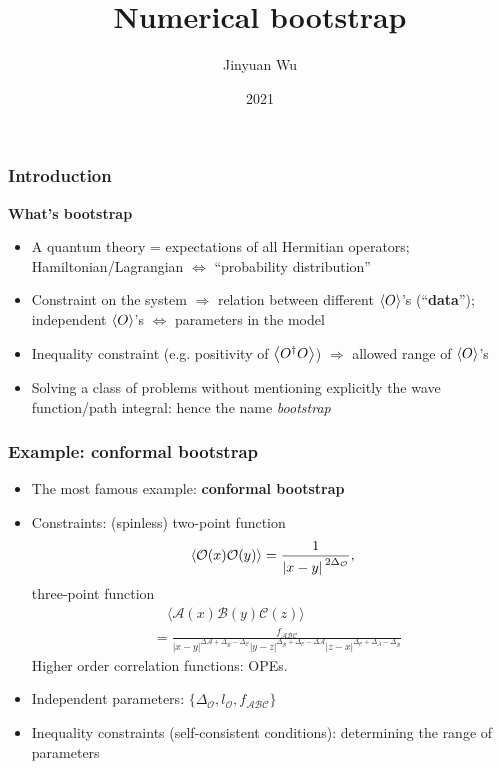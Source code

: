 \documentclass{beamer}
\title{Numerical bootstrap}
\author{Jinyuan Wu}
\institute{Department of Physics, Fudan University}
\date{2021}
\newcommand{\concept}[1]{\textbf{#1}}
\begin{document}
\frame{\titlepage}

\begin{frame}
\frametitle{Introduction}

\textbf{What's bootstrap}

\begin{itemize}
    \item A quantum theory = expectations of all Hermitian operators; 
    Hamiltonian/Lagrangian $\Leftrightarrow$ ``probability distribution''
    \item Constraint on the system $\Rightarrow$ relation between different $\expval{O}$'s (``\concept{data}'');
    independent $\expval{O}$'s $\Leftrightarrow$ parameters in the model
    \item Inequality constraint (e.g. positivity of $\expval{O^\dagger O}$) $\Rightarrow$ allowed 
    range of $\expval{O}$'s
    \item Solving a class of problems without mentioning explicitly the wave function/path integral: 
    hence the name \emph{bootstrap}
\end{itemize}

\vspace{1em}

\end{frame}

\begin{frame}
\frametitle{Example: conformal bootstrap}

\begin{itemize}
    \item The most famous example: \concept{conformal bootstrap}
    \item Constraints: (spinless) two-point function 
    \begin{equation}
        \expval*{\mathcal{O}(x) \mathcal{O}(y)} = \frac{1}{\abs*{x - y}^{2 \Delta_\mathcal{O}}},
    \end{equation}
    three-point function 
    \begin{equation}
        \begin{aligned}
            &\quad \langle\mathcal{A}(x) \mathcal{B}(y) \mathcal{C}(z)\rangle \\
            &= \frac{f_{\mathcal{A B C}}}{|x-y|^{\Delta \mathcal{A}+\Delta_{\mathcal{B}}-\Delta_{\mathcal{C}}}|y-z|^{\Delta_{\mathcal{B}}+\Delta_{\mathcal{C}}-\Delta \mathcal{A}}|z-x|^{\Delta_{\mathcal{C}}+\Delta_{\mathcal{A}}-\Delta_{\mathcal{B}}}}
        \end{aligned}
    \end{equation}
    Higher order correlation functions: OPEs. 
    \item Independent parameters: $\{\Delta_{\mathcal{O}}, l_{\mathcal{O}}, f_{\mathcal{A} \mathcal{B} \mathcal{C}}\}$
    \item Inequality constraints (self-consistent conditions): determining the range of parameters
\end{itemize}

\end{frame}
\end{document}
